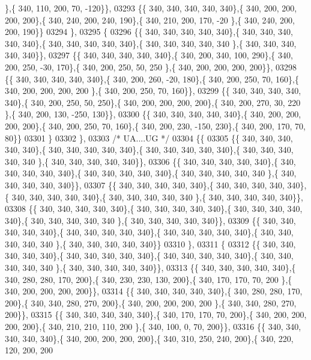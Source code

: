 \begin{DoxyCode}
      \},\{ 340, 110, 200,  70, -120\}\},
03293 \{\{ 340, 340, 340, 340, 340\},\{ 340, 200, 200, 200, 200\},\{ 340, 240, 200, 240, 190\},\{ 340, 210, 200, 170, -20
      \},\{ 340, 240, 200, 200, 190\}\}
03294 \},
03295 \{
03296 \{\{ 340, 340, 340, 340, 340\},\{ 340, 340, 340, 340, 340\},\{ 340, 340, 340, 340, 340\},\{ 340, 340, 340, 340, 340
      \},\{ 340, 340, 340, 340, 340\}\},
03297 \{\{ 340, 340, 340, 340, 340\},\{ 340, 200, 340, 100, 290\},\{ 340, 200, 250, -30, 170\},\{ 340, 200, 250,  50, 250
      \},\{ 340, 200, 200, 200, 200\}\},
03298 \{\{ 340, 340, 340, 340, 340\},\{ 340, 200, 260, -20, 180\},\{ 340, 200, 250,  70, 160\},\{ 340, 200, 200, 200, 200
      \},\{ 340, 200, 250,  70, 160\}\},
03299 \{\{ 340, 340, 340, 340, 340\},\{ 340, 200, 250,  50, 250\},\{ 340, 200, 200, 200, 200\},\{ 340, 200, 270,  30, 220
      \},\{ 340, 200, 130, -250, 130\}\},
03300 \{\{ 340, 340, 340, 340, 340\},\{ 340, 200, 200, 200, 200\},\{ 340, 200, 250,  70, 160\},\{ 340, 200, 230, -150, 
      230\},\{ 340, 200, 170,  70,  80\}\}
03301 \}
03302 \},
03303 \textcolor{comment}{/* UA....UG */}
03304 \{\{
03305 \{\{ 340, 340, 340, 340, 340\},\{ 340, 340, 340, 340, 340\},\{ 340, 340, 340, 340, 340\},\{ 340, 340, 340, 340, 340
      \},\{ 340, 340, 340, 340, 340\}\},
03306 \{\{ 340, 340, 340, 340, 340\},\{ 340, 340, 340, 340, 340\},\{ 340, 340, 340, 340, 340\},\{ 340, 340, 340, 340, 340
      \},\{ 340, 340, 340, 340, 340\}\},
03307 \{\{ 340, 340, 340, 340, 340\},\{ 340, 340, 340, 340, 340\},\{ 340, 340, 340, 340, 340\},\{ 340, 340, 340, 340, 340
      \},\{ 340, 340, 340, 340, 340\}\},
03308 \{\{ 340, 340, 340, 340, 340\},\{ 340, 340, 340, 340, 340\},\{ 340, 340, 340, 340, 340\},\{ 340, 340, 340, 340, 340
      \},\{ 340, 340, 340, 340, 340\}\},
03309 \{\{ 340, 340, 340, 340, 340\},\{ 340, 340, 340, 340, 340\},\{ 340, 340, 340, 340, 340\},\{ 340, 340, 340, 340, 340
      \},\{ 340, 340, 340, 340, 340\}\}
03310 \},
03311 \{
03312 \{\{ 340, 340, 340, 340, 340\},\{ 340, 340, 340, 340, 340\},\{ 340, 340, 340, 340, 340\},\{ 340, 340, 340, 340, 340
      \},\{ 340, 340, 340, 340, 340\}\},
03313 \{\{ 340, 340, 340, 340, 340\},\{ 340, 280, 280, 170, 200\},\{ 340, 230, 230, 130, 200\},\{ 340, 170, 170,  70, 200
      \},\{ 340, 200, 200, 200, 200\}\},
03314 \{\{ 340, 340, 340, 340, 340\},\{ 340, 280, 280, 170, 200\},\{ 340, 340, 280, 270, 200\},\{ 340, 200, 200, 200, 200
      \},\{ 340, 340, 280, 270, 200\}\},
03315 \{\{ 340, 340, 340, 340, 340\},\{ 340, 170, 170,  70, 200\},\{ 340, 200, 200, 200, 200\},\{ 340, 210, 210, 110, 200
      \},\{ 340, 100,   0,  70, 200\}\},
03316 \{\{ 340, 340, 340, 340, 340\},\{ 340, 200, 200, 200, 200\},\{ 340, 310, 250, 240, 200\},\{ 340, 220, 120, 200, 200

\end{DoxyCode}
